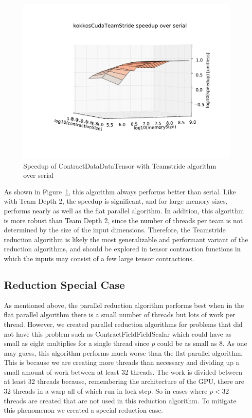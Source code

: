\begin{figure}[ht]
    \includegraphics[scale=.55]{./VersusSerial_kokkosCudaTeamStride_clearCache_shadowfax.pdf}
\caption{Speedup of ContractDataDataTensor with Teamstride algorithm over
    serial
\label{fig:ContractDataDataTensorTeamstride}} 
\end{figure}

As shown in Figure~\ref{fig:ContractDataDataTensorTeamstride}, this algorithm
always performs better than serial.  Like with Team Depth 2, the speedup is
significant, and for large memory sizes, performs nearly as well as the flat
parallel algorithm.  In addition, this algorithm is more robust than Team Depth
2, since the number of threads per team is not determined by the size of the
input dimensions.  Therefore, the Teamstride reduction algorithm is likely the
most generalizable and performant variant of the reduction algorithms, and
should be explored in tensor contraction functions in which the inputs may
consist of a few large tensor contractions.

\subsection{Reduction Special Case}
As mentioned above, the parallel reduction algorithm performs best when in the flat parallel algorithm there is a small number of threads but lots of work per thread. However, we created parallel reduction algorithms for problems that did not have this problem such as ContractFieldFieldScalar which could have as small as eight multiplies for a single thread since $p$ could be as small as 8. As one may guess, this algorithm performs much worse than the flat parallel algorithm. This is because we are creating more threads than necessary and dividing up a small amount of work between at least 32 threads. The work is divided between at least 32 threads because, remembering the architecture of the GPU, there are 32 threads in a warp all of which run in lock step. So in cases where $p < 32$ threads are created that are not used in this reduction algorithm. To mitigate this phenomenon we created a special reduction case.

